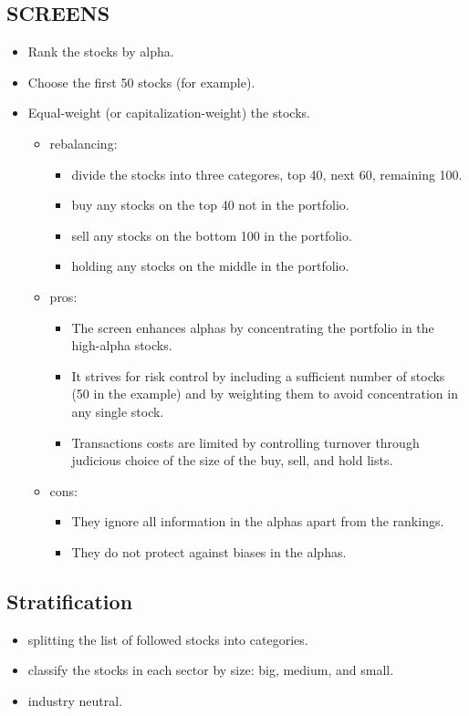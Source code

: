\documentclass[presentation]{beamer}
\begin{document}
\subsection{SCREENS}
\label{sec:orgheadline12}
\begin{itemize}
\item Rank the stocks by alpha.
\item Choose the first 50 stocks (for example).
\item Equal-weight (or capitalization-weight) the stocks.
\begin{itemize}
\item rebalancing:
\begin{itemize}
\item divide the stocks into three categores, top 40, next 60, remaining 100.
\item buy any stocks on the top 40 not in the portfolio.
\item sell any stocks on the bottom 100 in the portfolio.
\item holding any stocks on the middle in the portfolio.
\end{itemize}
\item pros:
\begin{itemize}
\item The screen enhances alphas by concentrating the portfolio in the high-alpha stocks.
\item It strives for risk control by including a sufficient number of stocks (50 in the example) and by weighting them to avoid concentration in any single stock.
\item Transactions costs are limited by controlling turnover through judicious choice of the size of the buy, sell, and hold lists.
\end{itemize}
\item cons:
\begin{itemize}
\item They ignore all information in the alphas apart from the rankings.
\item They do not protect against biases in the alphas.
\end{itemize}
\end{itemize}
\end{itemize}

\subsection{Stratification}
\label{sec:orgheadline13}
\begin{itemize}
\item splitting the list of followed stocks into categories.
\item classify the stocks in each sector by size: big, medium, and small.
\item industry neutral.
\end{itemize}
\end{document}

